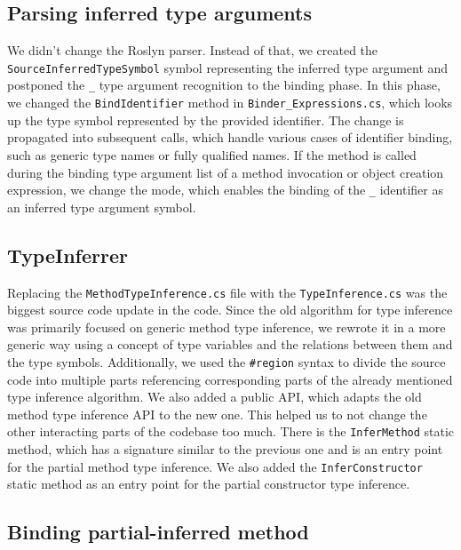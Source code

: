 \subsection{Parsing inferred type arguments}

We didn’t change the Roslyn parser. 
Instead of that, we created the\\ \texttt{SourceInferredTypeSymbol} symbol representing the inferred type argument and postponed the \texttt{\_} type argument recognition to the binding phase. 
In this phase, we changed the \texttt{BindIdentifier} method in \texttt{Binder\_Expressions.cs}, which looks up the type symbol represented by the provided identifier. 
The change is propagated into subsequent calls, which handle various cases of identifier binding, such as generic type names or fully qualified names. 
If the method is called during the binding type argument list of a method invocation or object creation expression, we change the mode, which enables the binding of the \texttt{\_} identifier as an inferred type argument symbol.

\subsection{TypeInferrer}

Replacing the \texttt{MethodTypeInference.cs} file with the \texttt{TypeInference.cs} was the biggest source code update in the code. 
Since the old algorithm for type inference was primarily focused on generic method type inference, we rewrote it in a more generic way using a concept of type variables and the relations between them and the type symbols. 
Additionally, we used the \texttt{\#region} syntax to divide the source code into multiple parts referencing corresponding parts of the already mentioned type inference algorithm. 
We also added a public API, which adapts the old method type inference API to the new one. 
This helped us to not change the other interacting parts of the codebase too much. 
There is the \texttt{InferMethod} static method, which has a signature similar to the previous one and is an entry point for the partial method type inference. 
We also added the \texttt{InferConstructor} static method as an entry point for the partial constructor type inference.

\subsection{Binding partial-inferred method}

